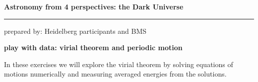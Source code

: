 \documentclass[a4paper,12pt]{article}
\newcommand{\HRule}{\rule{\linewidth}{0.3mm}}
\begin{document}
\pagestyle{empty}

\begin{center}
\LARGE \textbf{Astronomy from 4 perspectives: the Dark Universe}
\HRule
\end{center}
\begin{flushright}
prepared by: Heidelberg participants and BMS
\end{flushright}
\begin{center}
{\Large \textbf{play with data: virial theorem and periodic motion}}
\end{center}
\vspace{5mm}

\noindent
In these exercises we will explore the virial theorem by solving equations of motions numerically and measuring averaged energies from the solutions.
\end{document}
